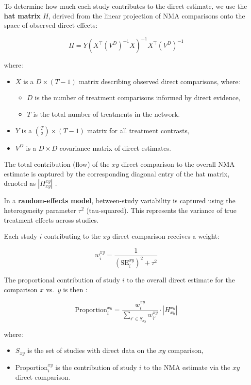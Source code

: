 To determine how much each study contributes to the direct estimate, we use the \textbf{hat matrix} $H$, derived from the linear projection of NMA comparisons onto the space of observed direct effects:

\[
H = Y (X^\top (V^D)^{-1} X)^{-1} X^\top (V^D)^{-1}
\]

where:
\begin{itemize}
  \item $X$ is a $D \times (T - 1)$ matrix describing observed direct comparisons, where:
  \begin{itemize}
    \item $D$ is the number of treatment comparisons informed by direct evidence,
    \item $T$ is the total number of treatments in the network.
  \end{itemize}
  \item $Y$ is a $\binom{T}{2} \times (T - 1)$ matrix for all treatment contrasts,
  \item $V^D$ is a $D \times D$ covariance matrix of direct estimates.
\end{itemize}

The total contribution (flow) of the $xy$ direct comparison to the overall NMA estimate is captured by the corresponding diagonal entry of the hat matrix, denoted as $\left| H^{xy}_{xy} \right|$ \citep{Papakonstantinou2018}.

In a \textbf{random-effects model}, between-study variability is captured using the heterogeneity parameter $\tau^2$ (tau-squared). This represents the variance of true treatment effects across studies. 

Each study $i$ contributing to the $xy$ direct comparison receives a weight:

\[
w^{xy}_{i} = \frac{1}{\left( \mathrm{SE}_i^{xy} \right)^2
 + \tau^2}
\]

The proportional contribution of study $i$ to the overall direct estimate for the comparison $x$ vs.\ $y$ is then \citep{Riley2018}:

\[
\text{Proportion}_i^{xy} = 
\frac{w_i^{xy}}{\sum\limits_{i' \in S_{xy}} w_{i'}^{xy}} 
\cdot \left| H^{xy}_{xy} \right|
\]

where:
\begin{itemize}
  \item $S_{xy}$ is the set of studies with direct data on the $xy$ comparison,
  \item $\text{Proportion}_i^{xy}$ is the contribution of study $i$ to the NMA estimate via the $xy$ direct comparison.
\end{itemize}

